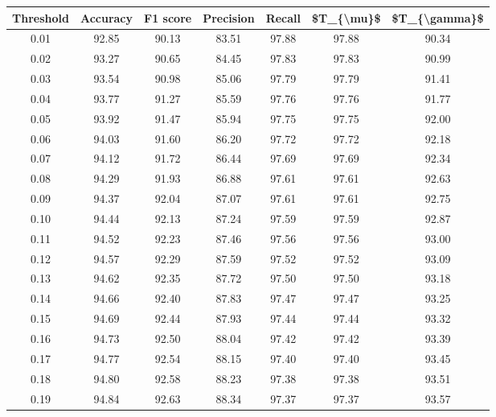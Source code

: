 \begin{tabular}{|c|c|c|c|c|c|c|}
\hline
 Threshold &  Accuracy &  F1 score &  Precision &  Recall &  \$T\_\{\textbackslash mu\}\$ &  \$T\_\{\textbackslash gamma\}\$ \\
\hline
      0.01 &     92.85 &     90.13 &      83.51 &   97.88 &      97.88 &         90.34 \\
      0.02 &     93.27 &     90.65 &      84.45 &   97.83 &      97.83 &         90.99 \\
      0.03 &     93.54 &     90.98 &      85.06 &   97.79 &      97.79 &         91.41 \\
      0.04 &     93.77 &     91.27 &      85.59 &   97.76 &      97.76 &         91.77 \\
      0.05 &     93.92 &     91.47 &      85.94 &   97.75 &      97.75 &         92.00 \\
      0.06 &     94.03 &     91.60 &      86.20 &   97.72 &      97.72 &         92.18 \\
      0.07 &     94.12 &     91.72 &      86.44 &   97.69 &      97.69 &         92.34 \\
      0.08 &     94.29 &     91.93 &      86.88 &   97.61 &      97.61 &         92.63 \\
      0.09 &     94.37 &     92.04 &      87.07 &   97.61 &      97.61 &         92.75 \\
      0.10 &     94.44 &     92.13 &      87.24 &   97.59 &      97.59 &         92.87 \\
      0.11 &     94.52 &     92.23 &      87.46 &   97.56 &      97.56 &         93.00 \\
      0.12 &     94.57 &     92.29 &      87.59 &   97.52 &      97.52 &         93.09 \\
      0.13 &     94.62 &     92.35 &      87.72 &   97.50 &      97.50 &         93.18 \\
      0.14 &     94.66 &     92.40 &      87.83 &   97.47 &      97.47 &         93.25 \\
      0.15 &     94.69 &     92.44 &      87.93 &   97.44 &      97.44 &         93.32 \\
      0.16 &     94.73 &     92.50 &      88.04 &   97.42 &      97.42 &         93.39 \\
      0.17 &     94.77 &     92.54 &      88.15 &   97.40 &      97.40 &         93.45 \\
      0.18 &     94.80 &     92.58 &      88.23 &   97.38 &      97.38 &         93.51 \\
      0.19 &     94.84 &     92.63 &      88.34 &   97.37 &      97.37 &         93.57 \\

\end{tabular}
